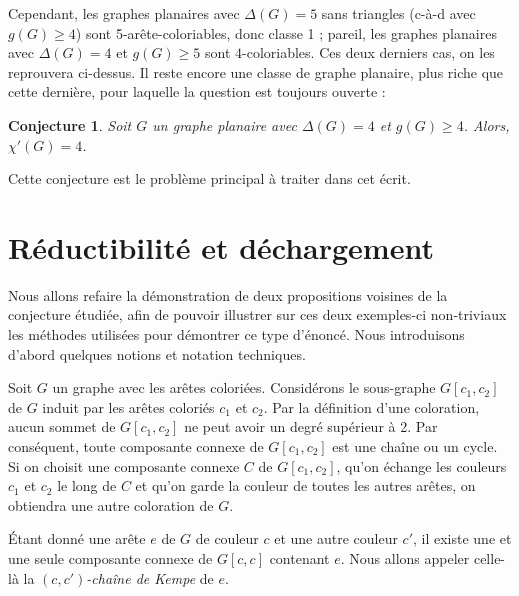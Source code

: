 \documentclass[10pt,a4paper]{article}
\newtheorem{conjecture}{Conjecture}
\begin{document}
Cependant, les graphes planaires avec $\Delta(G)=5$ sans triangles (c-à-d avec $g(G)\ge 4$) sont 5-arête-coloriables, donc classe 1 ; pareil, les graphes planaires avec $\Delta(G) = 4$ et $g(G)\ge 5$ sont $4$-coloriables. Ces deux derniers cas, on les reprouvera ci-dessus. Il reste encore une classe de graphe planaire, plus riche que cette dernière, pour laquelle la question est toujours ouverte :

\begin{conjecture}
Soit $G$ un graphe planaire avec $\Delta(G) = 4$ et $g(G) \geq 4$. Alors, $\chi'(G) = 4$. 
\end{conjecture} 

Cette conjecture est le problème principal à traiter dans cet écrit. 

\section{Réductibilité et déchargement}
\label{chap:easy}

Nous allons refaire la démonstration de deux propositions voisines de la conjecture étudiée, afin de pouvoir illustrer sur ces deux exemples-ci non-triviaux les méthodes utilisées pour démontrer ce type d'énoncé. Nous introduisons d'abord quelques notions et notation techniques.

Soit $G$ un graphe avec les arêtes coloriées. 
Considérons le sous-graphe $G[c_1,c_2]$ de $G$ induit par les arêtes coloriés $c_1$ et $c_2$. Par la définition d'une coloration, aucun sommet de $G[c_1,c_2]$ ne peut avoir un degré supérieur à 2. Par conséquent, toute composante connexe de $G[c_1,c_2]$ est une chaîne ou un cycle. Si on choisit une composante connexe $C$ de $G[c_1,c_2]$, qu'on échange les couleurs $c_1$ et $c_2$ le long de $C$ et qu'on garde la couleur de toutes les autres arêtes, on obtiendra une autre coloration de $G$.

Étant donné une arête $e$ de $G$ de couleur $c$ et une autre couleur $c'$, il existe une et une seule composante connexe de $G[c,c]$ contenant $e$.
Nous allons appeler celle-là la \emph{$(c,c')$-chaîne de Kempe} de $e$. 



\end{document}
